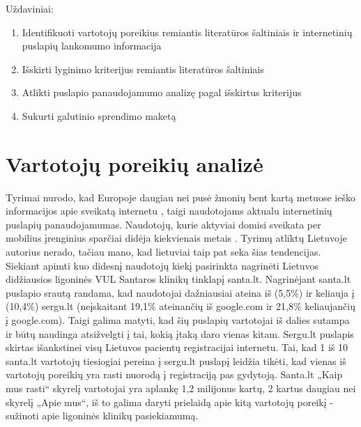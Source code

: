 \documentclass{VUMIFPSkursinis}
\begin{document}
Uždaviniai:
\begin{enumerate}
	\item Identifikuoti vartotojų poreikius remiantis literatūros šaltiniais ir internetinių puslapių lankomumo informacija
	\item Išskirti lyginimo kriterijus remiantis literatūros šaltiniais
	\item Atlikti puslapio panaudojamumo analizę pagal išskirtus kriterijus
	\item Sukurti galutinio sprendimo maketą
\end{enumerate}



\section{Vartotojų poreikių analizė}
Tyrimai nurodo, kad Europoje daugiau nei pusė žmonių bent kartą metuose ieško informacijos apie sveikatą internetu \cite{EuCitizDigHealthEn}, taigi naudotojams aktualu internetinių puslapių panaudojamumas. Naudotojų, kurie aktyviai domisi sveikata per mobilius įrenginius sparčiai didėja kiekvienais metais \cite{EmergingmHealthEn}. Tyrimų atliktų Lietuvoje autorius nerado, tačiau mano, kad lietuviai taip pat seka šias tendencijas. Siekiant apimti kuo didesnį naudotojų kiekį pasirinkta nagrinėti Lietuvos didžiausios ligoninės VUL Santaros klinikų tinklapį santa.lt. Nagrinėjant santa.lt puslapio srautą randama, kad naudotojai dažniausiai ateina iš (5,5\%) ir keliauja į (10,4\%) sergu.lt (neįskaitant 19,1\% ateinančių iš google.com ir 21,8\% keliaujančių į google.com)\cite{AlexaSantaEn}. Taigi galima matyti, kad šių puslapių vartotojai iš dalies sutampa ir būtų naudinga atsižvelgti į tai, kokią įtaką daro vienas kitam. Sergu.lt puslapis skirtas išankstinei visų Lietuvos pacientų registracijai internetu. Tai, kad 1 iš 10 santa.lt vartotojų tiesiogiai pereina į sergu.lt puslapį leidžia tikėti, kad vienas iš vartotojų poreikių yra rasti nuorodą į registraciją pas gydytoją. Santa.lt „Kaip mus rasti“ skyrelį vartotojai yra aplankę 1,2 milijonus kartų\cite{VulSkKaipMusRastiLt}, 2 kartus daugiau nei skyrelį „Apie mus“\cite{VulSkApieMusLt}, iš to galima daryti prielaidą apie kitą vartotojų poreikį - sužinoti apie ligoninės klinikų pasiekiamumą.
\end{document}
